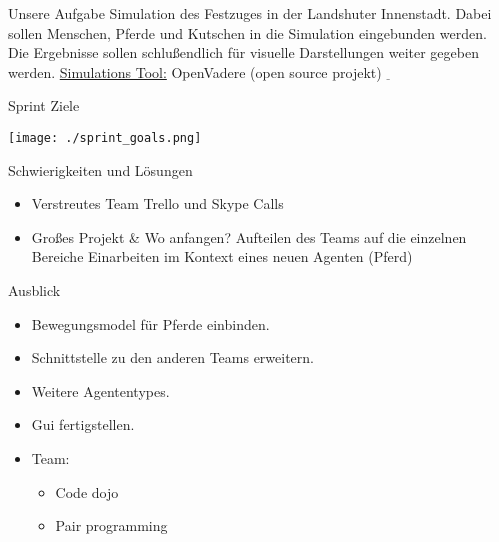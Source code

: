 \newcommand\tab[1][1cm]{\hspace*{#1}}
\graphicspath{{images/}{images/logos/}}
\begin{frame}{Unsere Aufgabe}
	Simulation des Festzuges in der Landshuter Innenstadt.
	Dabei sollen Menschen, Pferde und Kutschen in die Simulation eingebunden werden.
	Die Ergebnisse sollen schlußendlich für visuelle Darstellungen weiter gegeben werden.
	\newline \newline
	\underline{Simulations Tool:} \newline \tab OpenVadere (open source projekt) $\underline{}$
\end{frame}

\begin{frame}{Sprint Ziele}
	\begin{center}
		\texttt{[image: ./sprint\_goals.png]}
	\end{center}
\end{frame}

\begin{frame}{Schwierigkeiten und Lösungen}
	\begin{itemize}
		\item Verstreutes Team \newline \tab Trello und Skype Calls
		\item Großes Projekt \& Wo anfangen?
			 \newline \tab Aufteilen des Teams auf die einzelnen Bereiche
			 \newline \tab Einarbeiten im Kontext eines neuen Agenten (Pferd)
	\end{itemize}
\end{frame}

\begin{frame}{Ausblick}
	\begin{itemize}
		\item Bewegungsmodel für Pferde einbinden.
		\item Schnittstelle zu den anderen Teams erweitern.
		\item Weitere Agententypes.
		\item Gui fertigstellen.
		\item Team:
			\begin{itemize}
				\item Code dojo
				\item Pair programming
			\end{itemize}
	\end{itemize}
\end{frame}
